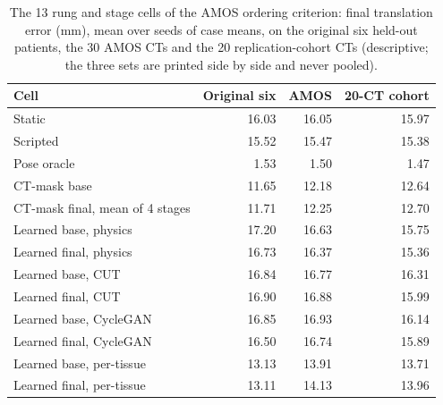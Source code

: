 
\begin{table}[tp]
\renewcommand{\baselinestretch}{1}\scriptsize
\caption{The 13 rung and stage cells of the AMOS ordering criterion: final translation error (mm), mean over seeds of case means, on the original six held-out patients, the 30 AMOS CTs and the 20 replication-cohort CTs (descriptive; the three sets are printed side by side and never pooled).}
\label{tab:s11-amos-cells}
\centering
\setlength{\tabcolsep}{3pt}
\begin{tabularx}{\textwidth}{@{}>{\raggedright\arraybackslash}X r r r@{}}
\toprule
Cell & Original six & AMOS & 20-CT cohort \\
\midrule
\quad Static & 16.03 & 16.05 & 15.97 \\
\quad Scripted & 15.52 & 15.47 & 15.38 \\
\quad Pose oracle & 1.53 & 1.50 & 1.47 \\
\quad CT-mask base & 11.65 & 12.18 & 12.64 \\
\quad CT-mask final, mean of 4 stages & 11.71 & 12.25 & 12.70 \\
\quad Learned base, physics & 17.20 & 16.63 & 15.75 \\
\quad Learned final, physics & 16.73 & 16.37 & 15.36 \\
\quad Learned base, CUT & 16.84 & 16.77 & 16.31 \\
\quad Learned final, CUT & 16.90 & 16.88 & 15.99 \\
\quad Learned base, CycleGAN & 16.85 & 16.93 & 16.14 \\
\quad Learned final, CycleGAN & 16.50 & 16.74 & 15.89 \\
\quad Learned base, per-tissue & 13.13 & 13.91 & 13.71 \\
\quad Learned final, per-tissue & 13.11 & 14.13 & 13.96 \\
\bottomrule
\end{tabularx}
\end{table}
